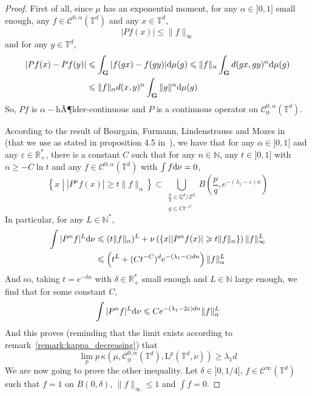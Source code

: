 \documentclass[11pt]{amsart}
\theoremstyle{definition}
\theoremstyle{remark}
\numberwithin{equation}{section}
\begin{document}
\begin{proof}
First of all, since $\mu$ has an exponential moment, for any $\alpha\in ]0,1]$ small enough, any $f\in \mathcal{C}^{0,\alpha}({\mathbb T}^d)$ and any $x\in {\mathbb T}^d$,
\[
|Pf(x)| \leqslant \|f\|_\infty
\]
and for any $y\in {\mathbb T}^d$,
\begin{align*}
\left|Pf(x) - Pf(y)\right| &\leqslant \int_{\mathbf G} |f(gx) - f(gy)| {{\rm d}}\mu(g) \leqslant \|f\|_\alpha \int_{\mathbf G} d(gx,gy)^\alpha {{\rm d}}\mu(g)\\
& \leqslant \|f\|_\alpha d(x,y)^\alpha \int_{\mathbf G} \|g\|^\alpha {{\rm d}}\mu(g)
\end{align*}
So, $Pf$ is $\alpha-$hÃ¶lder-continuous and $P$ is a continuous operator on $\mathcal{C}^{0,\alpha}_0({\mathbb T}^d)$.

\medskip
According to the result of Bourgain, Furmann, Lindenstrauss and Mozes in~\cite{BFLM11} (that we use as stated in proposition 4.5 in~\cite{Boytore}), we have that for any $\alpha\in ]0,1]$ and any $\varepsilon \in {\mathbb R}_+^\ast$, there is a constant $C$ such that for any $n\in {\mathbb N}$, any $t\in ]0,1]$ with $n\geqslant -C\ln t$ and any $f\in \mathcal{C}^{0,\alpha}({\mathbb T}^d)$ with $\int f{{\rm d}}\nu=0$,
\[
\left\{x\middle||P^n f(x)|\geqslant t \|f\|_\alpha \right\} \subset \bigcup_{\substack{\frac p q \in {\mathbb Q}^d/{\mathbb Z}^d\\q\leqslant Ct^{-C}}} B\left(\frac pq, e^{-(\lambda_1 - \varepsilon)n} \right) 
\]
In particular, for any $L\in {\mathbb N}^\ast$,
\begin{align*}
\int |P^n f|^L {{\rm d}}\nu& \leqslant (t\|f\|_\alpha)^L + \nu\left( \left\{x\middle||P^n f(x)|\geqslant t \|f\|_\alpha \right\}\right) \|f\|_\infty^L\\
& \leqslant \left(t^L +(Ct^{-C})^d e^{-(\lambda_1 - \varepsilon)dn} \right)\|f\|_\alpha^L 
\end{align*}
And so, taking $t=e^{-\delta n}$ with $\delta\in {\mathbb R}_+^\ast$ small enough and $L\in {\mathbb N}$ large enough, we find that for some constant $C$,
\[
\int|P^n f|^L {{\rm d}}\nu \leqslant Ce^{-(\lambda_1 - 2\varepsilon)dn} \|f\|_\alpha^L
\]
And this proves (reminding that the limit exists according to remark~\ref{remark:kappa_decreasing}) that
\[
\lim_p  p\, \kappa\left(\mu,\mathcal{C}^{0,\alpha}_0\left({\mathbb T}^d\right), \mathrm{L}^p\left({\mathbb T}^d,\nu\right) \right) \geqslant \lambda_1 d
\]
We are now going to prove the other inequality. Let $\delta \in ]0,1/4]$, $f\in \mathcal{C}^\infty({\mathbb T}^d)$ such that $f=1$ on $B(0,\delta)$, $\|f\|_\infty \leqslant 1$ and $\int f =0$.


\end{proof}
\end{document}
